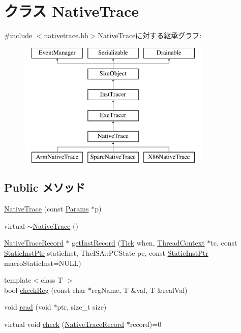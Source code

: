 \hypertarget{classTrace_1_1NativeTrace}{
\section{クラス NativeTrace}
\label{classTrace_1_1NativeTrace}
}


{\ttfamily \#include $<$nativetrace.hh$>$}NativeTraceに対する継承グラフ:\begin{figure}[H]
\begin{center}
\leavevmode
\includegraphics[height=6cm]{classTrace_1_1NativeTrace}
\end{center}
\end{figure}
\subsection*{Public メソッド}
\begin{DoxyCompactItemize}
\item 
\hyperlink{classTrace_1_1NativeTrace_a73d1a7e24b851b9d944e0074e73d71ff}{NativeTrace} (const \hyperlink{classTrace_1_1ExeTracer_a6680098765037131737b022c9fa9252e}{Params} $\ast$p)
\item 
virtual \hyperlink{classTrace_1_1NativeTrace_ab5703d1f8d7d995360c983a67a9af032}{$\sim$NativeTrace} ()
\item 
\hyperlink{classTrace_1_1NativeTraceRecord}{NativeTraceRecord} $\ast$ \hyperlink{classTrace_1_1NativeTrace_ad520c1272aab137c3e207f526088843c}{getInstRecord} (\hyperlink{base_2types_8hh_a5c8ed81b7d238c9083e1037ba6d61643}{Tick} when, \hyperlink{classThreadContext}{ThreadContext} $\ast$tc, const \hyperlink{classRefCountingPtr}{StaticInstPtr} staticInst, TheISA::PCState pc, const \hyperlink{classRefCountingPtr}{StaticInstPtr} macroStaticInst=NULL)
\item 
{\footnotesize template$<$class T $>$ }\\bool \hyperlink{classTrace_1_1NativeTrace_a1d9546c7840deae793284f3dcafeb684}{checkReg} (const char $\ast$regName, T \&val, T \&realVal)
\item 
void \hyperlink{classTrace_1_1NativeTrace_aebb629d36b64e2ff7e3351ca99614b12}{read} (void $\ast$ptr, size\_\-t size)
\item 
virtual void \hyperlink{classTrace_1_1NativeTrace_adb484644aa43b4370d31b6a7286b0dd1}{check} (\hyperlink{classTrace_1_1NativeTraceRecord}{NativeTraceRecord} $\ast$record)=0
\end{DoxyCompactItemize}
